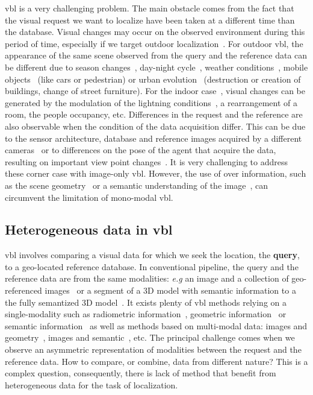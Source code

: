 	\Ac{vbl} is a very challenging problem. The main obstacle comes from the fact that the visual request we want to localize have been taken at a different time than the database. Visual changes may occur on the observed environment during this period of time, especially if we target outdoor localization~\citep{Lowry2016, Sattler2017a}. For outdoor \ac{vbl}, the appearance of the same scene observed from the query and the reference data can be different due to season changes~\citep{Krajnik2017a}, day-night cycle~\citep{Porav2018}, weather conditions~\citep{Porav2019}, mobile objects~\citep{Toft2018} (like cars or pedestrian) or urban evolution~\citep{Saha2018} (\eg destruction or creation of buildings, change of street furniture). For the indoor case~\citep{Taira2018}, visual changes can be generated by the modulation of the lightning conditions~\citep{Lu2016}, a rearrangement of a room, the people occupancy, etc. Differences in the request and the reference are also observable when the condition of the data acquisition differ. This can be due to the sensor architecture, \eg database and reference images acquired by a different cameras~\citep{Middelberg2014, Majdik2013} or to differences on the pose of the agent that acquire the data, resulting on important view point changes~\citep{Majdik2013, Torii2011, Lin2013, Vo2016, Tian2017}. It is very challenging to address these corner case with image-only \ac{vbl}. However, the use of over information, such as the scene geometry~\citep{Uy2018, Yew2018} or a semantic understanding of the image~\citep{Weinzaepfel2019}, can circumvent the limitation of mono-modal \ac{vbl}.
		
\subsection{Heterogeneous data in \acs{vbl}}
	\Ac{vbl} involves comparing a visual data for which we seek the location, the \textbf{query}, to a geo-located reference database. In conventional pipeline, the query and the reference data are from the same modalities: \textit{e.g} an image and a collection of geo-referenced images~\citep{Arandjelovic2014, Arandjelovic2017} or a segment of a 3D model with semantic information to a the fully semantized 3D model~\citep{Schonberger2017a}. It exists plenty of \ac{vbl} methods relying on a single-modality such as radiometric information~\citep{Liu2018, Radenovic2017}, geometric information~\citep{Uy2018, Yew2018} or semantic information~\citep{Ardeshir2014} as well as methods based on multi-modal data: images and geometry~\citep{Schonberger2017a}, images and semantic~\citep{Arandjelovic2014a}, etc. The principal challenge comes when we observe an asymmetric representation of modalities between the request and the reference data. How to compare, or combine, data from different nature? This is a complex question, consequently, there is lack of method that benefit from heterogeneous data for the task of localization.

